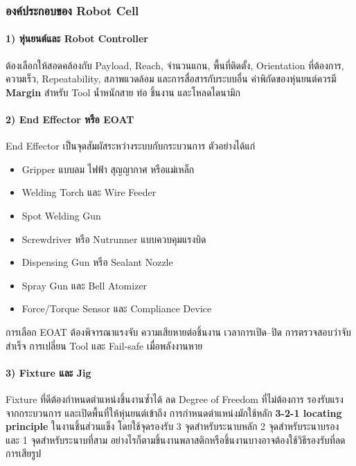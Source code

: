 \subsubsection{องค์ประกอบของ Robot Cell}

\paragraph{1) หุ่นยนต์และ Robot Controller}

ต้องเลือกให้สอดคล้องกับ Payload, Reach, จำนวนแกน, พื้นที่ติดตั้ง, Orientation ที่ต้องการ, ความเร็ว, Repeatability, สภาพแวดล้อม และการสื่อสารกับระบบอื่น ค่าพิกัดของหุ่นยนต์ควรมี \textbf{Margin} สำหรับ Tool น้ำหนักสาย ท่อ ชิ้นงาน และโหลดไดนามิก

\paragraph{2) End Effector หรือ EOAT}

End Effector เป็นจุดสัมผัสระหว่างระบบกับกระบวนการ ตัวอย่างได้แก่

\begin{itemize}
    \item Gripper แบบลม ไฟฟ้า สุญญากาศ หรือแม่เหล็ก
    \item Welding Torch และ Wire Feeder
    \item Spot Welding Gun
    \item Screwdriver หรือ Nutrunner แบบควบคุมแรงบิด
    \item Dispensing Gun หรือ Sealant Nozzle
    \item Spray Gun และ Bell Atomizer
    \item Force/Torque Sensor และ Compliance Device
\end{itemize}

การเลือก EOAT ต้องพิจารณาแรงจับ ความเสียหายต่อชิ้นงาน เวลาการเปิด–ปิด การตรวจสอบว่าจับสำเร็จ การเปลี่ยน Tool และ Fail-safe เมื่อพลังงานหาย

\paragraph{3) Fixture และ Jig}

Fixture ที่ดีต้องกำหนดตำแหน่งชิ้นงานซ้ำได้ ลด Degree of Freedom ที่ไม่ต้องการ รองรับแรงจากกระบวนการ และเปิดพื้นที่ให้หุ่นยนต์เข้าถึง การกำหนดตำแหน่งมักใช้หลัก \textbf{3-2-1 locating principle} ในงานชิ้นส่วนแข็ง โดยใช้จุดรองรับ 3 จุดสำหรับระนาบหลัก 2 จุดสำหรับระนาบรอง และ 1 จุดสำหรับระนาบที่สาม อย่างไรก็ตามชิ้นงานพลาสติกหรือชิ้นงานบางอาจต้องใช้วิธีรองรับที่ลดการเสียรูป

